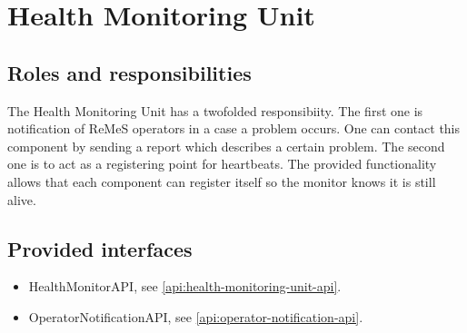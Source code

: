 \section{Health Monitoring Unit}
\label{element:health-monitoring-unit}

\subsection{Roles and responsibilities}

\npar The Health Monitoring Unit has a twofolded responsibiity. The first one is
notification of ReMeS operators in a case a problem occurs. One can contact this
component by sending a report which describes a certain problem. The second one
is to act as a registering point for heartbeats. The provided functionality
allows that each component can register itself so the monitor knows it is still
alive.

\subsection{Provided interfaces}

\begin{itemize}
  \item HealthMonitorAPI, see \ref{api:health-monitoring-unit-api}.
  \item OperatorNotificationAPI, see \ref{api:operator-notification-api}.
\end{itemize}




